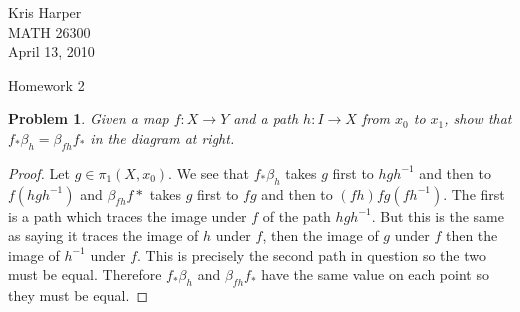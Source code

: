 \documentclass{article}
\newtheorem{problem}{Problem}
\begin{document}
\begin{flushright}
Kris Harper\\

MATH 26300\\

April 13, 2010
\end{flushright}

\begin{center}
Homework 2
\end{center}

\begin{problem}
Given a map $f : X \to Y$ and a path $h : I \to X$ from $x_0$ to $x_1$, show that $f_* \beta_h = \beta_{fh}f_*$ in the diagram at right.
\end{problem}
\begin{proof}
Let $g \in \pi_1(X,x_0)$. We see that $f_* \beta_h$ takes $g$ first to $hgh^{-1}$ and then to $f(hgh^{-1})$ and $\beta_{fh}f*$ takes $g$ first to $fg$ and then to $(fh)fg(fh^{-1})$. The first is a path which traces the image under $f$ of the path $hgh^{-1}$. But this is the same as saying it traces the image of $h$ under $f$, then the image of $g$ under $f$ then the image of $h^{-1}$ under $f$. This is precisely the second path in question so the two must be equal. Therefore $f_* \beta_h$ and $\beta_{fh} f_*$ have the same value on each point so they must be equal.
\end{proof}
\end{document}
